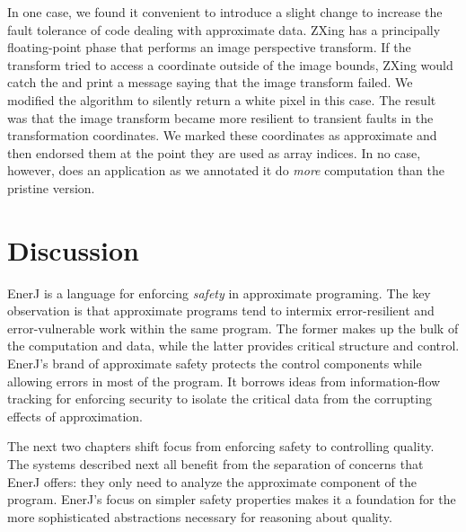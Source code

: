 In one case, we found it convenient to introduce a slight change to increase the
fault tolerance of code dealing with approximate data. ZXing has a principally
floating-point phase that performs an image perspective transform. If the
transform tried to access a coordinate outside of the image bounds,
ZXing would catch the  and print a
message saying that the image transform failed. We modified the algorithm to
silently return a white pixel in this case. The result was that the image
transform became more resilient to transient faults in the transformation
coordinates. We marked these coordinates as
approximate and then endorsed them at the point they are used as array
indices.
In no case, however, does an application as we annotated it do
\emph{more} computation than the pristine version.


\section{Discussion}
\label{enerj:sec:conc}

EnerJ is a language for enforcing \emph{safety} in approximate programing.
The key observation is that approximate programs tend to intermix
error-resilient and error-vulnerable work within the same program.
The former makes up the bulk of the computation and data, while the latter
provides critical structure and control.
EnerJ's brand of approximate safety protects the control components while
allowing errors in most of the program.
It borrows ideas from information-flow tracking for enforcing security to
isolate the critical data from the corrupting effects of approximation.

The next two chapters shift focus from enforcing safety
to controlling quality.
The systems described next all benefit from the separation of concerns that
EnerJ offers: they only need to analyze the approximate component of the
program.
EnerJ's focus on simpler safety properties makes
it a foundation for the more sophisticated abstractions necessary for
reasoning about quality.
